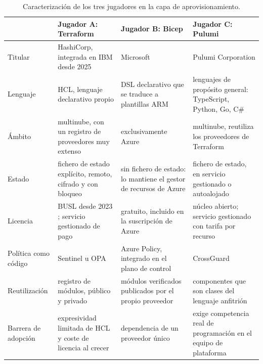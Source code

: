 \documentclass[11pt,letterpaper]{article}
\begin{document}
\begin{table}[htbp]
  \centering
  \footnotesize
  \setlength{\tabcolsep}{4pt}
  \caption{Caracterización de los tres jugadores en la capa de
  aprovisionamiento.}
  \label{tab:competidores}
  \begin{tabularx}{\textwidth}{@{}>{\raggedright\arraybackslash}p{}
    >{\raggedright\arraybackslash}X
    >{\raggedright\arraybackslash}X
    >{\raggedright\arraybackslash}X@{}}
    \toprule
    & \textbf{Jugador A: Terraform} & \textbf{Jugador B: Bicep} &
      \textbf{Jugador C: Pulumi} \\
    \midrule
    Titular & HashiCorp, integrada en IBM desde 2025 & Microsoft &
      Pulumi Corporation \\
    Lenguaje & HCL, lenguaje declarativo propio
      \parencite{terraformdocs} & DSL declarativo que se
      traduce a plantillas ARM & lenguajes de propósito general: TypeScript,
      Python, Go, C\# \\
    Ámbito & multinube, con un registro de proveedores muy extenso &
      exclusivamente Azure & multinube, reutiliza los proveedores de
      Terraform \\
    Estado & fichero de estado explícito, remoto, cifrado y con bloqueo
      \parencite{terraformstate} & sin fichero de estado: lo mantiene el
      gestor de recursos de Azure \parencite{deploymentstacks} & fichero de
      estado, en servicio gestionado o autoalojado \\
    Licencia & BUSL desde 2023 \parencite{hashicorpbusl}; servicio gestionado
      de pago & gratuito, incluido en la suscripción de Azure
      \parencite{bicepdocs} & núcleo abierto; servicio gestionado con tarifa
      por recurso \parencite{pulumidocs} \\
    Política como código & Sentinel u OPA \parencite{sentinel,opa} &
      Azure Policy, integrado en el plano de control &
      CrossGuard \\
    Reutilización & registro de módulos, público y privado & módulos
      verificados publicados por el propio proveedor \parencite{avm} &
      componentes que son clases del lenguaje anfitrión \\
    Barrera de adopción & expresividad limitada de HCL y coste de licencia al
      crecer & dependencia de un proveedor único & exige competencia real de
      programación en el equipo de plataforma \\
    \bottomrule
  \end{tabularx}
\end{table}
\end{document}
